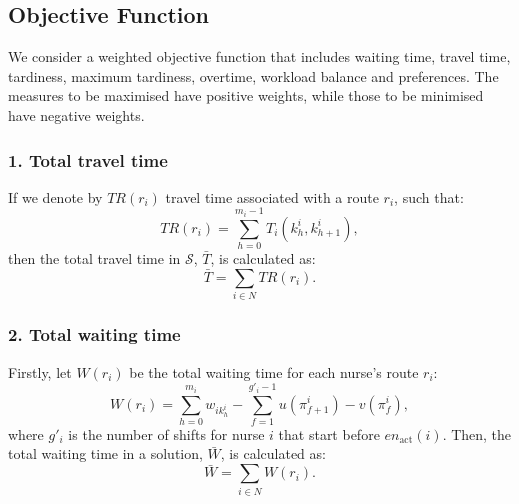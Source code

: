 \documentclass[a4paper,11pt,authoryear]{elsarticle}
\begin{document}
\subsection{Objective Function}
\label{sub:objectivefunc}
\noindent We consider a weighted objective function that includes waiting time, travel time, tardiness, maximum tardiness, overtime, workload balance and preferences. The measures to be maximised have positive weights, while those to be minimised have negative weights.

\subsubsection*{1. Total travel time}
\noindent If we denote by $TR(r_i)$ travel time associated with a route $r_i$, such that:
\begin{equation}
	TR(r_i) =  \sum_{h = 0}^{m_i - 1} T_i(k^i_h, k^i_{h + 1}), \label{eq:traveltimenurse}
\end{equation}
then the total travel time in $\mathcal{S}$, $\bar{T}$, is calculated as:
\begin{equation}
	\bar{T} = \sum_{i \in N}  TR(r_i). \label{eq:totaltraveltime}
\end{equation}

\subsubsection*{2. Total waiting time}
\noindent Firstly, let $W(r_i)$ be the total waiting time for each nurse's route $r_i$:
\begin{equation}
	W(r_i) = \displaystyle\sum_{h=0}^{m_i} w_{i k_{h}^i} - \displaystyle\sum_{f=1}^{g'_i - 1} u(\pi_{f+1}^i) - v(\pi_f^i), \label{eq:waitingtimenurse}
\end{equation}
\noindent where $g'_i$ is the number of shifts for nurse $i$ that start before $en_{\text{act}}(i)$. Then, the total waiting time in a solution, $\bar{W}$, is calculated as:
\begin{equation}
     \bar{W} = \sum_{i \in N} W(r_i). \label{eq:totalwaitingtime}
\end{equation}
\end{document}
